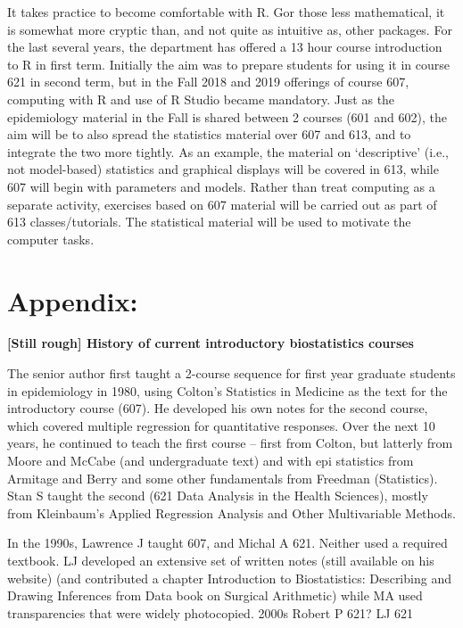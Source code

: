 \documentclass[]{book}
\begin{document}
It takes practice to become comfortable with R. Gor those less mathematical, it is somewhat more cryptic than, and not quite as intuitive as, other packages. For the last several years, the department has offered a 13 hour course introduction to R in first term. Initially the aim was to prepare students for using it in course 621 in second term, but in the Fall 2018 and 2019 offerings of course 607, computing with R and use of R Studio became mandatory. Just as the epidemiology material in the Fall is shared between 2 courses (601 and 602), the aim will be to also spread the statistics material over 607 and 613, and to integrate the two more tightly. As an example, the material on `descriptive' (i.e., not model-based) statistics and graphical displays will be covered in 613, while 607 will begin with parameters and models. Rather than treat computing as a separate activity, exercises based on 607 material will be carried out as part of 613 classes/tutorials. The statistical material will be used to motivate the computer tasks.

\hypertarget{appendix}{%
\section{Appendix:}\label{appendix}}

\textbf{{[}Still rough{]} History of current introductory biostatistics courses}

The senior author first taught a 2-course sequence for first year graduate students in epidemiology in 1980, using Colton's Statistics in Medicine as the text for the introductory course (607). He developed his own notes for the second course, which covered multiple regression for quantitative responses. Over the next 10 years, he continued to teach the first course -- first from Colton, but latterly from Moore and McCabe (and undergraduate text) and with epi statistics from Armitage and Berry and some other fundamentals from Freedman
(Statistics). Stan S taught the second (621 Data Analysis in the Health Sciences), mostly from Kleinbaum's Applied Regression Analysis and Other Multivariable Methods.

In the 1990s, Lawrence J taught 607, and Michal A 621. Neither used a required textbook. LJ developed an extensive set of written notes (still available on his website) (and contributed a chapter Introduction to Biostatistics: Describing and Drawing Inferences from Data
book on Surgical Arithmetic) while MA used transparencies that were widely photocopied. 2000s Robert P 621? LJ 621
\end{document}
